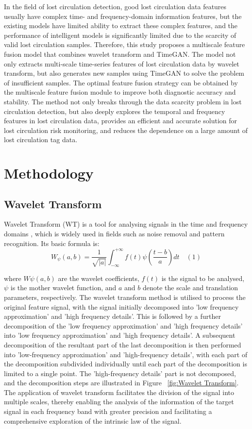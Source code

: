 \documentclass[journal,article,submit,pdftex,moreauthors]{Definitions/mdpi}
\begin{document}
In the field of lost circulation detection, good lost circulation data features usually have complex time- and frequency-domain information features, but the existing models have limited ability to extract these complex features, and the performance of intelligent models is significantly limited due to the scarcity of valid lost circulation samples. Therefore, this study proposes a multiscale feature fusion model that combines wavelet transform and TimeGAN. The model not only extracts multi-scale time-series features of lost circulation data by wavelet transform, but also generates new samples using TimeGAN to solve the problem of insufficient samples. The optimal feature fusion strategy can be obtained by the multiscale feature fusion module to improve both diagnostic accuracy and stability. The method not only breaks through the data scarcity problem in lost circulation detection, but also deeply explores the temporal and frequency features in lost circulation data, provides an efficient and accurate solution for lost circulation risk monitoring, and reduces the dependence on a large amount of lost circulation tag data.

\section{Methodology}
\subsection{Wavelet Transform}

Wavelet Transform (WT) is a tool for analysing signals in the time and frequency domains \cite{Grossmann1984}, which is widely used in fields such as noise removal and pattern recognition. Its basic formula is:
\[{{W}_{\psi }}(a,b)=\frac{1}{\sqrt{|a|}}\mathop{\int }_{-\infty }^{+\infty }f(t)\psi (\frac{t-b}{a})dt\quad (1)\]

where $W\psi(a, b)$ are the wavelet coefficients, $f(t)$ is the signal to be analysed, $\psi$ is the mother wavelet function, and $a$ and $b$ denote the scale and translation parameters, respectively.
The wavelet transform method is utilised to process the original feature signal, with the signal initially decomposed into 'low frequency approximation' and 'high frequency details'. This is followed by a further decomposition of the 'low frequency approximation' and 'high frequency details' into 'low frequency approximation' and 'high frequency details'. A subsequent decomposition of the resultant part of the last decomposition is then performed into 'low-frequency approximation' and 'high-frequency details', with each part of the decomposition subdivided individually until each part of the decomposition is limited to a single point. The 'high-frequency details' part is not decomposed, and the decomposition steps are illustrated in Figure ~\ref{fig:Wavelet Transform}. The application of wavelet transform facilitates the division of the signal into multiple scales, thereby enabling the analysis of the information of the target signal in each frequency band with greater precision and facilitating a comprehensive exploration of the intrinsic law of the signal.
\end{document}
